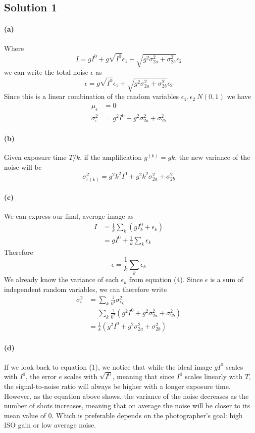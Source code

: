 \documentclass{article}
\newcommand{\solution}[1]{\clearpage \subsection*{Solution #1}}
\newcommand{\spart}[1]{\paragraph{(#1)}}
\begin{document}

\solution{1}

\spart{a} Where 
\begin{equation} 
I = gI^0 + g\sqrt{I^0} \epsilon_1 + \sqrt{g^2 \sigma_{2a}^2+\sigma_{2b}^2} \epsilon_2
\end{equation}
we can write the total noise $\epsilon$ as
\begin{equation}
\epsilon = g\sqrt{I^0} \epsilon_1 + \sqrt{g^2 \sigma_{2a}^2+\sigma_{2b}^2} \epsilon_2
\end{equation}
Since this is a linear combination of the random variables $\epsilon_1, \epsilon_2 ~ N(0,1)$ we have
\begin{align}
\mu_{\epsilon} &= 0 \\
\sigma^2_\epsilon &= g^2I^0 + g^2\sigma^2_{2a} + \sigma^2_{2b}
\end{align}


\spart{b} Given exposure time $T/k$, if the amplification $g^{(k)} = gk$, the new variance of the noise will be
\begin{equation}
\sigma^2_{\epsilon(k)} = g^2k^2I^0 + g^2k^2\sigma^2_{2a} + \sigma^2_{2b}
\end{equation}

\spart{c} We can express our final, average image as 
\begin{align}
I &= \frac{1}{k} \sum_k( gI^0_k + \epsilon_k) \\
  &= gI^0 + \frac{1}{k} \sum_k \epsilon_k
\end{align}
Therefore
\begin{equation}
\epsilon = \frac{1}{k} \sum_k \epsilon_k
\end{equation}
We already know the variance of each $\epsilon_k$ from equation (4). Since $\epsilon$ is a sum of independent random variables, we can therefore write
\begin{align}
\sigma^2_\epsilon &= \sum_k \frac{1}{k^2} \sigma^2_{\epsilon_k} \\
 &= \sum_k \frac{1}{k^2} \left( g^2I^0 + g^2\sigma^2_{2a} + \sigma^2_{2b} \right)\\
 &= \frac{1}{k} \left( g^2I^0 + g^2\sigma^2_{2a} + \sigma^2_{2b} \right)
\end{align}

\spart{d} If we look back to equation (1), we notice that while the ideal image $gI^0$ scales with $I^0$, the error $e$ scales with $\sqrt{I^0}$, meaning that since $I^0$ scales linearly with $T$, the signal-to-noise ratio will always be higher with a longer exposure time. However, as the equation above shows, the variance of the noise decreases as the number of shots increases, meaning that on average the noise will be closer to its mean value of 0. Which is preferable depends on the photographer's goal: high ISO gain or low average noise. 
\end{document}
